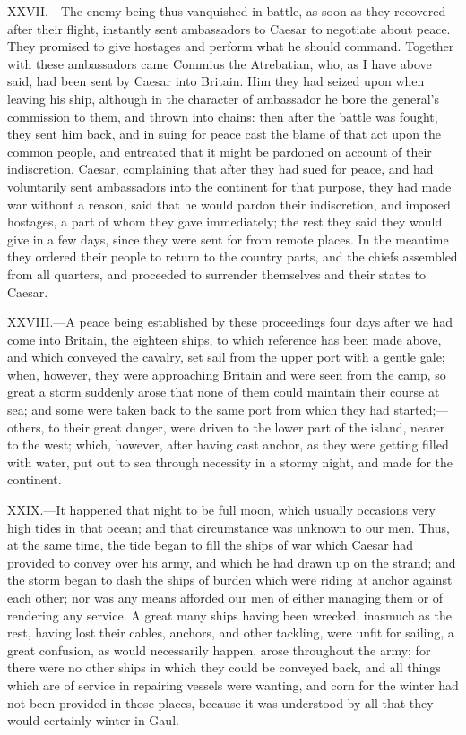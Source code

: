 XXVII.—The enemy being thus vanquished in battle, as soon as they
recovered after their flight, instantly sent ambassadors to Caesar to
negotiate about peace. They promised to give hostages and perform what
he should command. Together with these ambassadors came Commius the
Atrebatian, who, as I have above said, had been sent by Caesar into
Britain. Him they had seized upon when leaving his ship, although in the
character of ambassador he bore the general's commission to them, and
thrown into chains: then after the battle was fought, they sent him
back, and in suing for peace cast the blame of that act upon the common
people, and entreated that it might be pardoned on account of their
indiscretion. Caesar, complaining that after they had sued for peace,
and had voluntarily sent ambassadors into the continent for that
purpose, they had made war without a reason, said that he would pardon
their indiscretion, and imposed hostages, a part of whom they gave
immediately; the rest they said they would give in a few days, since
they were sent for from remote places. In the meantime they ordered
their people to return to the country parts, and the chiefs assembled
from all quarters, and proceeded to surrender themselves and their
states to Caesar.

XXVIII.—A peace being established by these proceedings four days after
we had come into Britain, the eighteen ships, to which reference has
been made above, and which conveyed the cavalry, set sail from the upper
port with a gentle gale; when, however, they were approaching Britain
and were seen from the camp, so great a storm suddenly arose that none
of them could maintain their course at sea; and some were taken back to
the same port from which they had started;—others, to their great
danger, were driven to the lower part of the island, nearer to the west;
which, however, after having cast anchor, as they were getting filled
with water, put out to sea through necessity in a stormy night, and made
for the continent.

XXIX.—It happened that night to be full moon, which usually occasions
very high tides in that ocean; and that circumstance was unknown to our
men. Thus, at the same time, the tide began to fill the ships of war
which Caesar had provided to convey over his army, and which he had
drawn up on the strand; and the storm began to dash the ships of burden
which were riding at anchor against each other; nor was any means
afforded our men of either managing them or of rendering any service. A
great many ships having been wrecked, inasmuch as the rest, having lost
their cables, anchors, and other tackling, were unfit for sailing, a
great confusion, as would necessarily happen, arose throughout the army;
for there were no other ships in which they could be conveyed back, and
all things which are of service in repairing vessels were wanting, and
corn for the winter had not been provided in those places, because it
was understood by all that they would certainly winter in Gaul.


